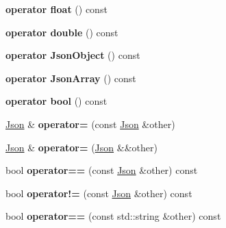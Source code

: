 \begin{DoxyCompactItemize}
{\bfseries operator float} () const
\item 
\mbox{\label{classnta_1_1utils_1_1Json_aa008316811bc941ea29073ae46a358b4}} 
{\bfseries operator double} () const
\item 
\mbox{\label{classnta_1_1utils_1_1Json_a5511be349de94fa21d72582d86429d53}} 
{\bfseries operator Json\+Object} () const
\item 
\mbox{\label{classnta_1_1utils_1_1Json_aed69f0d4f5090100d9e1e8d5df0f01ac}} 
{\bfseries operator Json\+Array} () const
\item 
\mbox{\label{classnta_1_1utils_1_1Json_ab1284552f59903991ed0ad31fc2ad91f}} 
{\bfseries operator bool} () const
\item 
\mbox{\label{classnta_1_1utils_1_1Json_a3f673cffc8988a0d3d68e081dd3360ed}} 
\hyperlink{classnta_1_1utils_1_1Json}{Json} \& {\bfseries operator=} (const \hyperlink{classnta_1_1utils_1_1Json}{Json} \&other)
\item 
\mbox{\label{classnta_1_1utils_1_1Json_a52fbe1664fe12b582c5e2b18cc2cfdc8}} 
\hyperlink{classnta_1_1utils_1_1Json}{Json} \& {\bfseries operator=} (\hyperlink{classnta_1_1utils_1_1Json}{Json} \&\&other)
\item 
\mbox{\label{classnta_1_1utils_1_1Json_a5ef5f3aea0472da1682d1a6757073491}} 
bool {\bfseries operator==} (const \hyperlink{classnta_1_1utils_1_1Json}{Json} \&other) const
\item 
\mbox{\label{classnta_1_1utils_1_1Json_a97b88c3b36c4ea7640074b676abe7a89}} 
bool {\bfseries operator!=} (const \hyperlink{classnta_1_1utils_1_1Json}{Json} \&other) const
\item 
\mbox{\label{classnta_1_1utils_1_1Json_a70675599c2188f99903ac40f30a10615}} 
bool {\bfseries operator==} (const std\+::string \&other) const
\item 
\mbox{\label{classnta_1_1utils_1_1Json_a8f4bfd013e4e02783f2283506590b5f6}} 

\end{DoxyCompactItemize}
